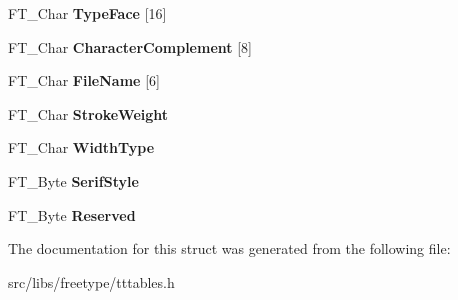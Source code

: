 \begin{DoxyCompactItemize}
\item 
\hypertarget{struct_t_t___p_c_l_t___a47c2c6b276f3ab2002fe03af41dad396}{
FT\_\-Char {\bfseries TypeFace} \mbox{[}16\mbox{]}}
\label{struct_t_t___p_c_l_t___a47c2c6b276f3ab2002fe03af41dad396}

\item 
\hypertarget{struct_t_t___p_c_l_t___a2641686beb550bcf8d9e598336f0acd9}{
FT\_\-Char {\bfseries CharacterComplement} \mbox{[}8\mbox{]}}
\label{struct_t_t___p_c_l_t___a2641686beb550bcf8d9e598336f0acd9}

\item 
\hypertarget{struct_t_t___p_c_l_t___a87691bde7cb06e3043f5320c8223e768}{
FT\_\-Char {\bfseries FileName} \mbox{[}6\mbox{]}}
\label{struct_t_t___p_c_l_t___a87691bde7cb06e3043f5320c8223e768}

\item 
\hypertarget{struct_t_t___p_c_l_t___aaf28b05ac07bcdc1ae6f4ec9064434fc}{
FT\_\-Char {\bfseries StrokeWeight}}
\label{struct_t_t___p_c_l_t___aaf28b05ac07bcdc1ae6f4ec9064434fc}

\item 
\hypertarget{struct_t_t___p_c_l_t___ad6613ad7556599343f999a7d27a0f1d0}{
FT\_\-Char {\bfseries WidthType}}
\label{struct_t_t___p_c_l_t___ad6613ad7556599343f999a7d27a0f1d0}

\item 
\hypertarget{struct_t_t___p_c_l_t___aa8e3d35937660a1e4959ee10a4800e6a}{
FT\_\-Byte {\bfseries SerifStyle}}
\label{struct_t_t___p_c_l_t___aa8e3d35937660a1e4959ee10a4800e6a}

\item 
\hypertarget{struct_t_t___p_c_l_t___a2e46e3f5eaa51e02d831d3f6143f8846}{
FT\_\-Byte {\bfseries Reserved}}
\label{struct_t_t___p_c_l_t___a2e46e3f5eaa51e02d831d3f6143f8846}

\end{DoxyCompactItemize}


The documentation for this struct was generated from the following file:\begin{DoxyCompactItemize}
\item 
src/libs/freetype/tttables.h\end{DoxyCompactItemize}
